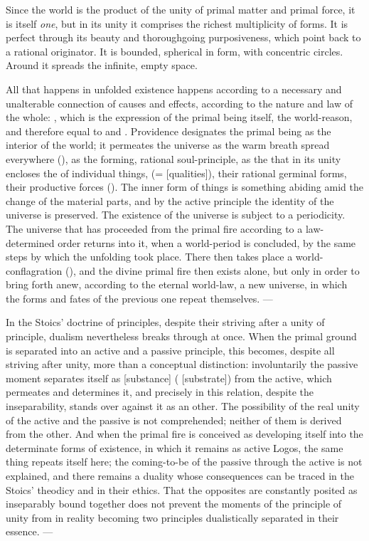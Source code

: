 Since the world is the product of the unity of primal matter and primal
force, it is itself \emph{one}, but in its unity it comprises the richest
multiplicity of forms. It is perfect through its beauty and thoroughgoing
purposiveness, which point back to a rational originator. It is bounded,
spherical in form, with concentric circles. Around it spreads the
infinite, empty space.

All that happens in unfolded existence happens according to a necessary
and unalterable connection of causes and effects, according to the
nature and law of the whole: , which is the expression of
the primal being itself, the world-reason, and therefore equal to
 and . Providence designates the primal being as
the interior of the world; it permeates the universe as the warm breath
spread everywhere (), as the forming, rational soul-principle,
as the  that in its unity encloses the
 of individual things, (= 
[qualities]), their rational germinal forms, their productive forces
(). The inner form of things is something abiding
amid the change of the material parts, and by the active principle the
identity of the universe is preserved. The existence of the universe is
subject to a periodicity. The universe that has proceeded from the primal
fire according to a law-determined order returns into it, when a
world-period is concluded, by the same steps by which the unfolding took
place. There then takes place a world-conflagration (),
and the divine primal fire then exists alone, but only in order to bring
forth anew, according to the eternal world-law, a new universe, in which
the forms and fates of the previous one repeat themselves. ---

In the Stoics' doctrine of principles, despite their striving after a
unity of principle, dualism nevertheless breaks through at once. When
the primal ground is separated into an active and a passive principle,
this becomes, despite all striving after unity, more than a
conceptual distinction: involuntarily the passive moment separates itself
as  [substance] ( [substrate]) from the active,
which permeates and determines it, and precisely in this relation,
despite the inseparability, stands over against it as an other. The
possibility of the real unity of the active and the passive is not
comprehended; neither of them is derived from the other. And when the
primal fire is conceived as developing itself into the determinate forms
of existence, in which it remains as active Logos, the same thing repeats
itself here; the coming-to-be of the passive through the active is not
explained, and there remains a duality whose consequences can be traced
in the Stoics' theodicy and in their ethics. That the opposites are
constantly posited as inseparably bound together does not prevent the
moments of the principle of unity from in reality becoming two principles
dualistically separated in their essence. ---

